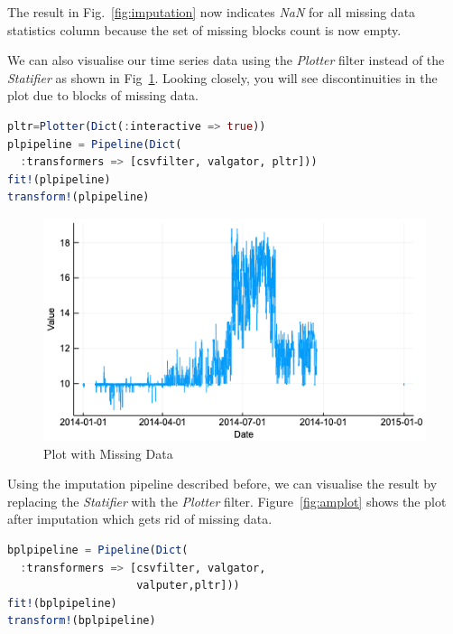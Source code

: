 \documentclass{juliacon}
\begin{document}
The result in Fig.~\ref{fig:imputation} now indicates \emph{NaN} for all missing data statistics column because the set 
of missing blocks count is now empty.

\vskip 6pt

We can also visualise our time series data using the \emph{Plotter} filter instead of the \emph{Statifier} as shown in Fig~\ref{fig:mplot}. Looking closely, you will see discontinuities in the plot due to blocks of missing data.

\begin{lstlisting}[language = Julia]
pltr=Plotter(Dict(:interactive => true))
plpipeline = Pipeline(Dict(
  :transformers => [csvfilter, valgator, pltr]))
fit!(plpipeline)
transform!(plpipeline)
\end{lstlisting}

\begin{figure}[htbp]
   \centering
   \includegraphics[width=\columnwidth]{mplot.png} %
   \caption{Plot with Missing Data}
   \label{fig:mplot}
\end{figure}

Using the imputation pipeline described before, we can visualise the result by replacing the \emph{Statifier} with the \emph{Plotter} filter. Figure~\ref{fig:amplot} shows the plot after imputation which gets rid of missing data.

\begin{lstlisting}[language = Julia]
bplpipeline = Pipeline(Dict(
  :transformers => [csvfilter, valgator, 
                    valputer,pltr]))
fit!(bplpipeline)
transform!(bplpipeline)
\end{lstlisting}
\end{document}
